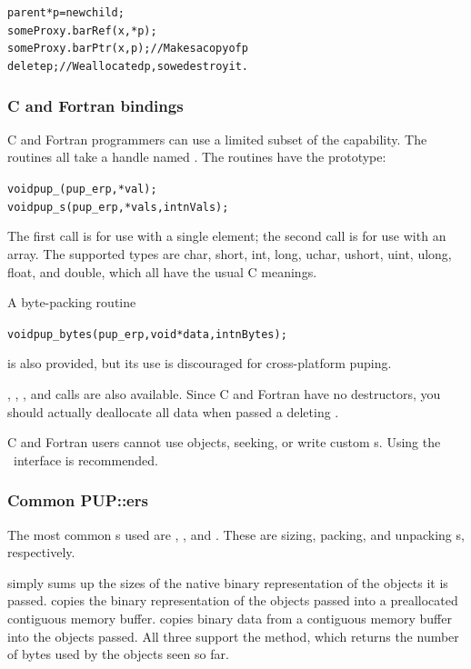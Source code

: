 \begin{alltt}
   parent *p=new child;
   someProxy.barRef(x,*p);
   someProxy.barPtr(x,p); // Makes a copy of p
   delete p; // We allocated p, so we destroy it.
\end{alltt}


\subsubsection{C and Fortran bindings}

C and Fortran programmers can use a limited subset of the
 capability.  The routines all take a 
handle named .  The routines 
have the prototype:
\begin{alltt}
void pup\_(pup\_er p, *val);
void pup\_s(pup\_er p, *vals,int nVals);
\end{alltt}
The first call is for use with a single element;
the second call is for use with an array.
The supported types are char, short, int, long,
uchar, ushort, uint, ulong, float, and double,
which all have the usual C meanings.

A byte-packing routine
\begin{alltt}
void pup\_bytes(pup\_er p,void *data,int nBytes);
\end{alltt}
is also provided, but its use is discouraged
for cross-platform puping.

, , ,
and  calls are also available.
Since C and Fortran have no destructors, you should 
actually deallocate all data when passed a deleting .

C and Fortran users cannot use  objects, 
seeking, or write custom s. Using the \CC\
interface is recommended.



\subsubsection{Common PUP::ers}

The most common s used are ,
, and .  These are sizing,
packing, and unpacking s, respectively.

 simply sums up the sizes of the native
binary representation of the objects it is passed.
 copies the binary representation of the
objects passed into a preallocated contiguous memory buffer.
 copies binary data from a contiguous memory
buffer into the objects passed.  All three support the
 method, which returns the number of bytes used
by the objects seen so far.

